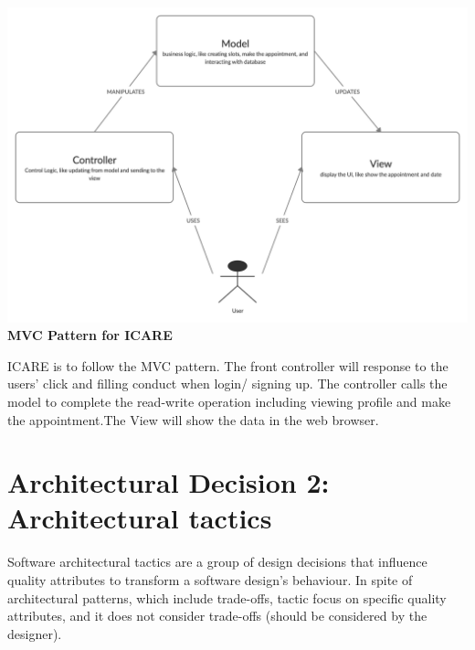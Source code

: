 \documentclass[a4paper,12pt]{report}
\begin{document}
\begin{enumerate}
    \begin{center}
        \includegraphics[scale=.2]{UML/MVC.png}\\
        \textbf{MVC Pattern for ICARE}
\end{center}

    ICARE is to follow the MVC pattern. The front controller will response to the users' click and filling conduct when login/ signing up. The controller calls the model to complete the read-write operation including viewing profile and make the appointment.The View will show the data in the web browser. 
\end{enumerate}
 
 
 
\section*{Architectural Decision 2: Architectural tactics}
Software architectural tactics are a group of design decisions that influence quality attributes to transform a software design’s behaviour. In spite of architectural patterns, which include trade-offs, tactic focus on specific quality attributes, and it does not consider trade-offs (should be considered by the designer).
\end{document}
